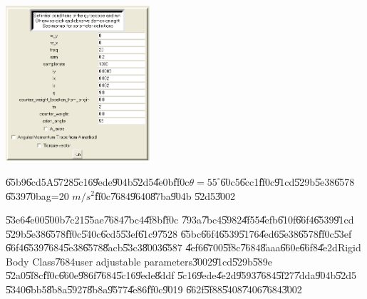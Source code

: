 \begin{center}
\includegraphics[width=0.4\textwidth]{./figs/parameter_1.png}
\end{center}%

\clearpage%

\begin{case}
\U{65b9}\U{6cd5}A\U{5728}\U{5c16}\U{9ede}\U{904b}\U{52d5}\U{4e0b}\U{ff0c}$%
\theta =55^{\circ }$\U{60c5}\U{6cc1}\U{ff0c}\U{91cd}\U{529b}\U{5e38}\U{6578}%
\U{6539}\U{70ba}g=20 $m/s^{2}$\U{ff0c}\U{7684}\U{9640}\U{87ba}\U{904b}%
\U{52d5}\U{3002}
\end{case}

\U{53e6}\U{4e00}\U{500b}\U{7c21}\U{55ae}\U{7684}\U{7bc4}\U{4f8b}\U{ff0c}%
\U{793a}\U{7bc4}\U{5982}\U{4f55}\U{4efb}\U{610f}\U{66f4}\U{6539}\U{91cd}%
\U{529b}\U{5e38}\U{6578}\U{ff0c}\U{540c}\U{6cd5}\U{53ef}\U{61c9}\U{7528}%
\U{65bc}\U{66f4}\U{6539}\U{5176}\U{4ed6}\U{5e38}\U{6578}\U{ff0c}\U{53ef}%
\U{66f4}\U{6539}\U{7684}\U{5e38}\U{6578}\U{8acb}\U{53c3}\U{8003}\U{6587}%
\U{4ef6}\U{6700}\U{5f8c}\U{7684}\U{8aaa}\U{660e}\U{66f8}\U{4e2d}Rigid Body
Class\U{7684}user adjustable parameters\U{3002}\U{91cd}\U{529b}\U{589e}%
\U{52a0}\U{5f8c}\U{ff0c}\U{660e}\U{986f}\U{7684}\U{5c16}\U{9ede}\U{8ddf}%
\U{5c16}\U{9ede}\U{4e2d}\U{9593}\U{7684}\U{5f27}\U{7dda}\U{904b}\U{52d5}%
\U{5340}\U{6bb5}\U{8b8a}\U{5927}\U{8b8a}\U{9577}\U{4e86}\U{ff0c}\U{9019}%
\U{662f}\U{5f88}\U{5408}\U{7406}\U{7684}\U{3002}

%
\begin{center}

\end{center}%

